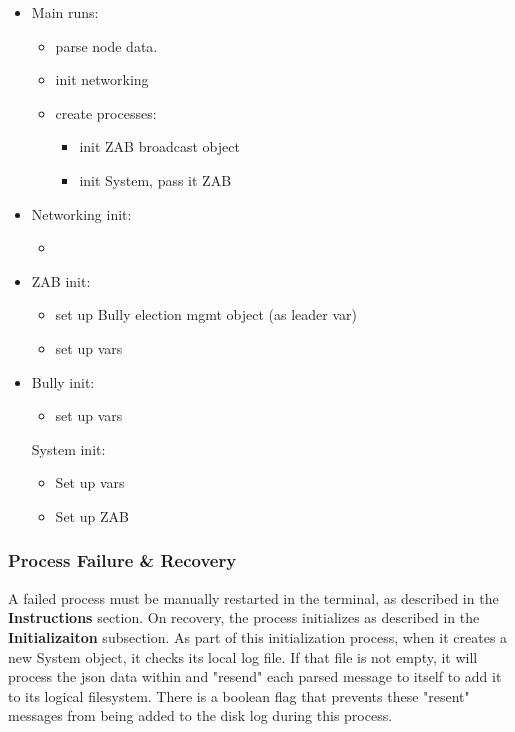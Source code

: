 \documentclass{article}
\begin{document}
\begin{itemize}
\item
    Main runs:
    \begin{itemize}
        \item parse node data.
        \item init networking
        \item create processes:
        \begin{itemize}
            \item init ZAB broadcast object
            \item init System, pass it ZAB
        \end{itemize}
    \end{itemize}
\item
    Networking init:
    \begin{itemize}
        \item
    \end{itemize}
\item
    ZAB init:
    \begin{itemize}
        \item set up Bully election mgmt object (as leader var)
        \item    set up vars
    \end{itemize}
\item
    Bully init:
    \begin{itemize}
        \item set up vars
    \end{itemize}

    System init:
    \begin{itemize}
        \item Set up vars
        \item Set up ZAB
    \end{itemize}
\end{itemize}

    \subsubsection*{Process Failure \& Recovery}
        A failed process must be manually restarted in the terminal, as described in the \textbf{Instructions} section. On recovery, the process initializes as described in the \textbf{Initializaiton} subsection. As part of this initialization process, when it creates a new System object, it checks its local log file. If that file is not empty, it will process the json data within and "resend" each parsed message to itself to add it to its logical filesystem. There is a boolean flag that prevents these "resent" messages from being added to the disk log during this process.
\end{document}
